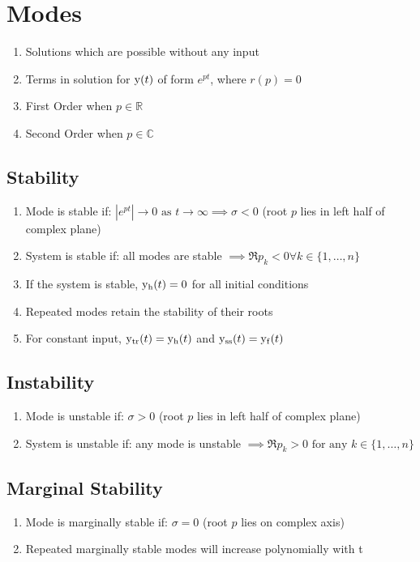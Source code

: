 \section*{Modes}
\begin{enumerate}
    \item Solutions which are possible without any input
    \item Terms in solution for \( \func{y}[t] \) of form \( e^{pt} \), where \( r(p) = 0 \)
    \item First Order when \( p \in \mathbb{R} \)
    \item Second Order when \( p \in \mathbb{C} \)
\end{enumerate}

\subsection*{Stability}
\begin{enumerate}
    \item Mode is stable if: \( |e^{pt}| \to 0 \text{ as } t \to \infty \implies \sigma < 0 \) (root \( p \) lies in left half of complex plane)
    \item System is stable if: all modes are stable \( \implies \Re{p_k} < 0 \forall k \in \{1, \dots, n\} \)
    \item If the system is stable, \( \func{y_h}[t] = 0 \) for all initial conditions
    \item Repeated modes retain the stability of their roots
    \item For constant input, \( \func{y_{\text{tr}}}[t] = \func{y_h}[t] \) and \( \func{y_{\text{ss}}}[t] = \func{y_f}[t] \)
\end{enumerate}

\subsection*{Instability}
\begin{enumerate}
    \item Mode is unstable if: \( \sigma > 0 \) (root \( p \) lies in left half of complex plane)
    \item System is unstable if: any mode is unstable \( \implies \Re{p_k} > 0 \text{ for any } k \in \{1, \dots, n\} \)
\end{enumerate}

\subsection*{Marginal Stability}
\begin{enumerate}
    \item Mode is marginally stable if: \( \sigma = 0 \) (root \( p \) lies on complex axis)
    \item Repeated marginally stable modes will increase polynomially with t
\end{enumerate}

